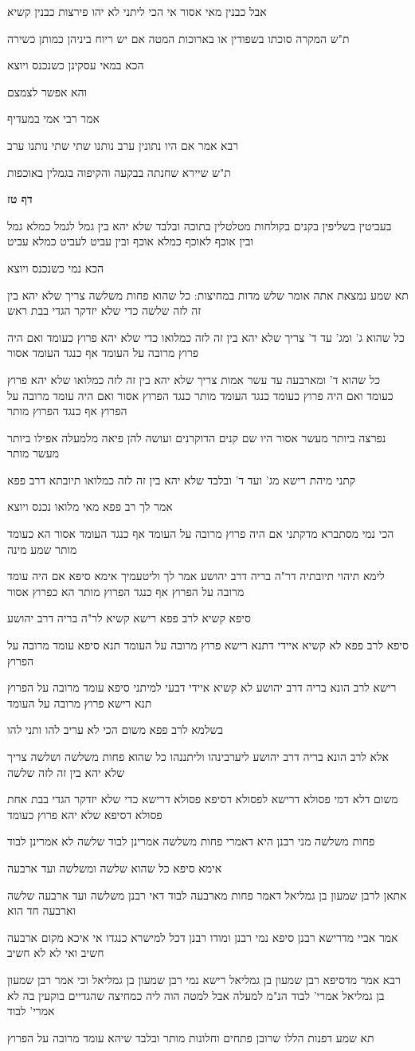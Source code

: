 \documentclass[12pt, openany]{book}
\newcommand{\sethebfont}{
\fontsize{10.5pt}{21.0pt} \selectfont
}
\newcommand{\textblock}[1]{
{\sethebfont #1\\}	
}
\newcommand{\sectname}{}
\newcommand{\newsection}[1]{
	\addcontentsline{toc}{section}{#1}
	\renewcommand{\sectname}{#1}	
	\vspace{-\baselineskip}
	\begin{center}
		\textbf{%
\fontsize{16pt}{16pt}\selectfont
			#1}
	\end{center}
	\vspace{-\baselineskip}
	\nopagebreak
}
\begin{document}
\textblock{אבל כבנין מאי אסור אי הכי ליתני לא יהו פירצות כבנין קשיא}
\textblock{ת"ש המקרה סוכתו בשפודין או בארוכות המטה אם יש ריוח ביניהן כמותן כשירה}
\textblock{הכא במאי עסקינן כשנכנס ויוצא}
\textblock{והא אפשר לצמצם}
\textblock{אמר רבי אמי במעדיף}
\textblock{רבא אמר אם היו נתונין ערב נותנו שתי שתי נותנו ערב}
\textblock{ת"ש שיירא שחנתה בבקעה והקיפוה בגמלין באוכפות}
\newsection{דף טז}
\textblock{בעביטין בשליפין בקנים בקולחות מטלטלין בתוכה ובלבד שלא יהא בין גמל לגמל כמלא גמל ובין אוכף לאוכף כמלא אוכף ובין עביט לעביט כמלא עביט}
\textblock{הכא נמי כשנכנס ויוצא}
\textblock{תא שמע נמצאת אתה אומר שלש מדות במחיצות: כל שהוא פחות משלשה צריך שלא יהא בין זה לזה שלשה כדי שלא יזדקר הגדי בבת ראש}
\textblock{כל שהוא ג' ומג' עד ד' צריך שלא יהא בין זה לזה כמלואו כדי שלא יהא פרוץ כעומד ואם היה פרוץ מרובה על העומד אף כנגד העומד אסור}
\textblock{כל שהוא ד' ומארבעה עד עשר אמות צריך שלא יהא בין זה לזה כמלואו שלא יהא פרוץ כעומד ואם היה פרוץ כעומד כנגד העומד מותר כנגד הפרוץ אסור ואם היה עומד מרובה על הפרוץ אף כנגד הפרוץ מותר}
\textblock{נפרצה ביותר מעשר אסור היו שם קנים הדוקרנים ועושה להן פיאה מלמעלה אפילו ביותר מעשר מותר}
\textblock{קתני מיהת רישא מג' ועד ד' ובלבד שלא יהא בין זה לזה כמלואו תיובתא דרב פפא}
\textblock{אמר לך רב פפא מאי מלואו נכנס ויוצא}
\textblock{הכי נמי מסתברא מדקתני אם היה פרוץ מרובה על העומד אף כנגד העומד אסור הא כעומד מותר שמע מינה}
\textblock{לימא תיהוי תיובתיה דר"ה בריה דרב יהושע אמר לך וליטעמיך אימא סיפא אם היה עומד מרובה על הפרוץ אף כנגד הפרוץ מותר הא כפרוץ אסור}
\textblock{סיפא קשיא לרב פפא רישא קשיא לר"ה בריה דרב יהושע}
\textblock{סיפא לרב פפא לא קשיא איידי דתנא רישא פרוץ מרובה על העומד תנא סיפא עומד מרובה על הפרוץ}
\textblock{רישא לרב הונא בריה דרב יהושע לא קשיא איידי דבעי למיתני סיפא עומד מרובה על הפרוץ תנא רישא פרוץ מרובה על העומד}
\textblock{בשלמא לרב פפא משום הכי לא עריב להו ותני להו}
\textblock{אלא לרב הונא בריה דרב יהושע ליערבינהו וליתננהו כל שהוא פחות משלשה ושלשה צריך שלא יהא בין זה לזה שלשה}
\textblock{משום דלא דמי פסולא דרישא לפסולא דסיפא פסולא דרישא כדי שלא יזדקר הגדי בבת אחת פסולא דסיפא שלא יהא פרוץ כעומד}
\textblock{פחות משלשה מני רבנן היא דאמרי פחות משלשה אמרינן לבוד שלשה לא אמרינן לבוד}
\textblock{אימא סיפא כל שהוא שלשה ומשלשה ועד ארבעה}
\textblock{אתאן לרבן שמעון בן גמליאל דאמר פחות מארבעה לבוד דאי רבנן משלשה ועד ארבעה שלשה וארבעה חד הוא}
\textblock{אמר אביי מדרישא רבנן סיפא נמי רבנן ומודו רבנן דכל למישרא כנגדו אי איכא מקום ארבעה חשיב ואי לא לא חשיב}
\textblock{רבא אמר מדסיפא רבן שמעון בן גמליאל רישא נמי רבן שמעון בן גמליאל וכי אמר רבן שמעון בן גמליאל אמרי' לבוד הנ"מ למעלה אבל למטה הוה ליה כמחיצה שהגדיים בוקעין בה לא אמרי' לבוד}
\textblock{תא שמע דפנות הללו שרובן פתחים וחלונות מותר ובלבד שיהא עומד מרובה על הפרוץ}
\end{document}
